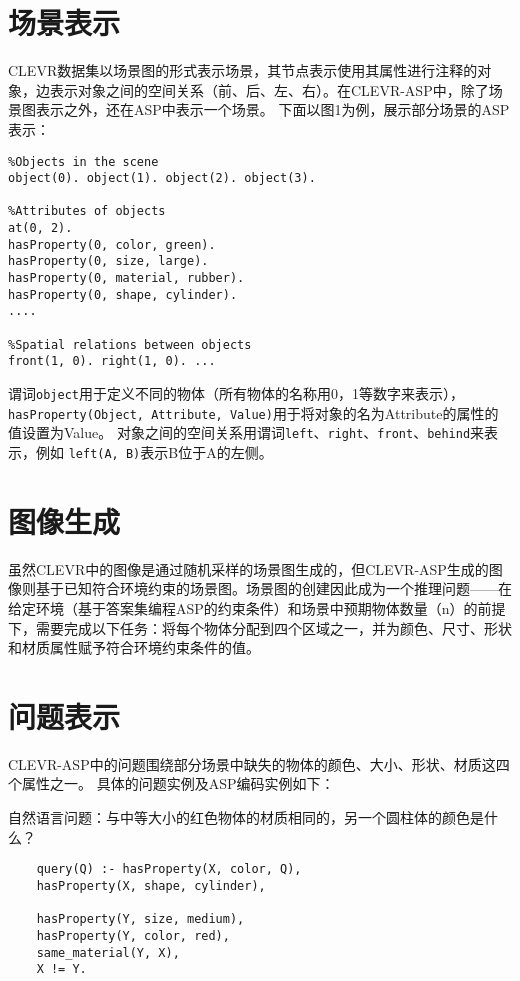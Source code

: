 \section{场景表示}
CLEVR数据集以场景图的形式表示场景，其节点表示使用其属性进行注释的对象，边表示对象之间的空间关系（前、后、左、右）。在CLEVR-ASP中，除了场景图表示之外，还在ASP中表示一个场景。
下面以图1为例，展示部分场景的ASP表示：

\begin{lstlisting}
%Objects in the scene
object(0). object(1). object(2). object(3).

%Attributes of objects
at(0, 2).
hasProperty(0, color, green).
hasProperty(0, size, large).
hasProperty(0, material, rubber).
hasProperty(0, shape, cylinder).
....

%Spatial relations between objects
front(1, 0). right(1, 0). ...
\end{lstlisting}

谓词\texttt{object}用于定义不同的物体（所有物体的名称用0，1等数字来表示），
\texttt{hasProperty(Object, Attribute, Value)}用于将对象的名为Attribute的属性的值设置为Value。
对象之间的空间关系用谓词\texttt{left}、\texttt{right}、\texttt{front}、\texttt{behind}来表示，例如
\texttt{left(A, B)}表示B位于A的左侧。

\section{图像生成}
虽然CLEVR中的图像是通过随机采样的场景图生成的，但CLEVR-ASP生成的图像则基于已知符合环境约束的场景图。场景图的创建因此成为一个推理问题——在给定环境（基于答案集编程ASP的约束条件）和场景中预期物体数量（n）的前提下，需要完成以下任务：将每个物体分配到四个区域之一，并为颜色、尺寸、形状和材质属性赋予符合环境约束条件的值。

\section{问题表示}
CLEVR-ASP中的问题围绕部分场景中缺失的物体的颜色、大小、形状、材质这四个属性之一。
具体的问题实例及ASP编码实例如下：

自然语言问题：与中等大小的红色物体的材质相同的，另一个圆柱体的颜色是什么？

\begin{lstlisting}
    query(Q) :- hasProperty(X, color, Q),
    hasProperty(X, shape, cylinder),

    hasProperty(Y, size, medium),
    hasProperty(Y, color, red),
    same_material(Y, X),
    X != Y.
\end{lstlisting}

